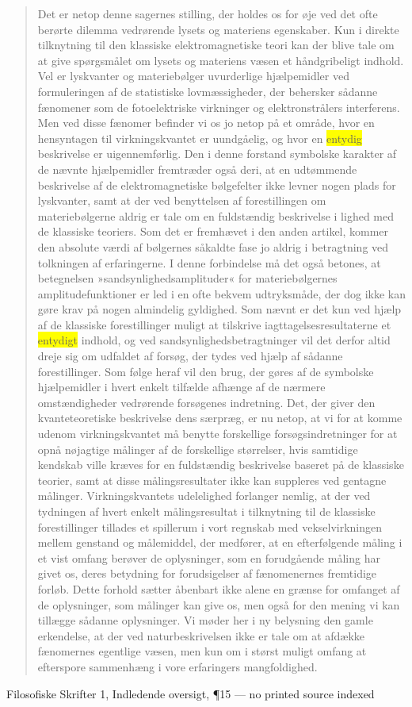 \documentclass[11pt]{article}
\newcommand{\dcite}[1]{{\nopagebreak\raggedleft\small #1\par}\medskip}
\newcommand{\tlg}[1]{{\setlength{\fboxsep}{0.8pt}\colorbox{yellow}{#1}}}
\begin{document}
\begin{quote}
Det er netop denne sagernes stilling, der holdes os for øje ved det ofte berørte dilemma vedrørende lysets og materiens egenskaber. Kun i direkte tilknytning til den klassiske elektromagnetiske teori kan der blive tale om at give spørgsmålet om lysets og materiens væsen et håndgribeligt indhold. Vel er lyskvanter og materiebølger uvurderlige hjælpemidler ved formuleringen af de statistiske lovmæssigheder, der behersker sådanne fænomener som de fotoelektriske virkninger og elektronstrålers interferens. Men ved disse fænomer befinder vi os jo netop på et område, hvor en hensyntagen til virkningskvantet er uundgåelig, og hvor en \tlg{entydig} beskrivelse er uigennemførlig. Den i denne forstand symbolske karakter af de nævnte hjælpemidler fremtræder også deri, at en udtømmende beskrivelse af de elektromagnetiske bølgefelter ikke levner nogen plads for lyskvanter, samt at der ved benyttelsen af forestillingen om materiebølgerne aldrig er tale om en fuldstændig beskrivelse i lighed med de klassiske teoriers. Som det er fremhævet i den anden artikel, kommer den absolute værdi af bølgernes såkaldte fase jo aldrig i betragtning ved tolkningen af erfaringerne. I denne forbindelse må det også betones, at betegnelsen »sandsynlighedsamplituder« for materiebølgernes amplitudefunktioner er led i en ofte bekvem udtryksmåde, der dog ikke kan gøre krav på nogen almindelig gyldighed. Som nævnt er det kun ved hjælp af de klassiske forestillinger muligt at tilskrive iagttagelsesresultaterne et \tlg{entydigt} indhold, og ved sandsynlighedsbetragtninger vil det derfor altid dreje sig om udfaldet af forsøg, der tydes ved hjælp af sådanne forestillinger. Som følge heraf vil den brug, der gøres af de symbolske hjælpemidler i hvert enkelt tilfælde afhænge af de nærmere omstændigheder vedrørende forsøgenes indretning. Det, der giver den kvanteteoretiske beskrivelse dens særpræg, er nu netop, at vi for at komme udenom virkningskvantet må benytte forskellige forsøgsindretninger for at opnå nøjagtige målinger af de forskellige størrelser, hvis samtidige kendskab ville kræves for en fuldstændig beskrivelse baseret på de klassiske teorier, samt at disse målingsresultater ikke kan suppleres ved gentagne målinger. Virkningskvantets udelelighed forlanger nemlig, at der ved tydningen af hvert enkelt målingsresultat i tilknytning til de klassiske forestillinger tillades et spillerum i vort regnskab med vekselvirkningen mellem genstand og målemiddel, der medfører, at en efterfølgende måling i et vist omfang berøver de oplysninger, som en forudgående måling har givet os, deres betydning for forudsigelser af fænomenernes fremtidige forløb. Dette forhold sætter åbenbart ikke alene en grænse for omfanget af de oplysninger, som målinger kan give os, men også for den mening vi kan tillægge sådanne oplysninger. Vi møder her i ny belysning den gamle erkendelse, at der ved naturbeskrivelsen ikke er tale om at afdække fænomernes egentlige væsen, men kun om i størst muligt omfang at efterspore sammenhæng i vore erfaringers mangfoldighed.
\end{quote}
\dcite{Filosofiske Skrifter 1, Indledende oversigt, ¶15 — no printed source indexed}
\end{document}
